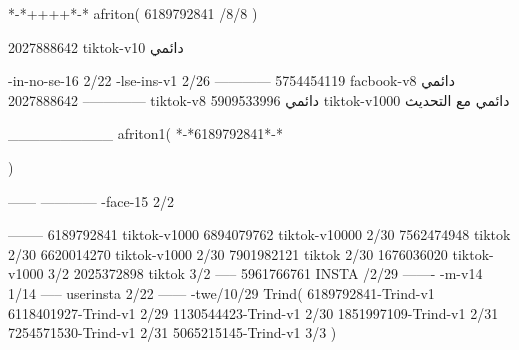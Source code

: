 *-*++++*-*
afriton(
6189792841 /8/8
)

2027888642 tiktok-v10
دائمي

-in-no-se-16 2/22
-lse-ins-v1 2/26
------------
5754454119 facbook-v8
دائمي
--------------
2027888642 tiktok-v8
دائمي
5909533996 tiktok-v1000
دائمي مع التحديث

__________
afriton1(
*-*6189792841*-*

)


------
------------
-face-15 2/2

--------
6189792841 tiktok-v1000
6894079762 tiktok-v10000 2/30
7562474948 tiktok 2/30
6620014270 tiktok-v1000 2/30
7901982121 tiktok 2/30
1676036020 tiktok-v1000 3/2
2025372898 tiktok  3/2
-----
5961766761 INSTA /2/29
-------
-m-v14 1/14
-----
userinsta 2/22
------
-twe/10/29
Trind(
6189792841-Trind-v1 
6118401927-Trind-v1 2/29
1130544423-Trind-v1 2/30
1851997109-Trind-v1 2/31
7254571530-Trind-v1 2/31
5065215145-Trind-v1 3/3
)
